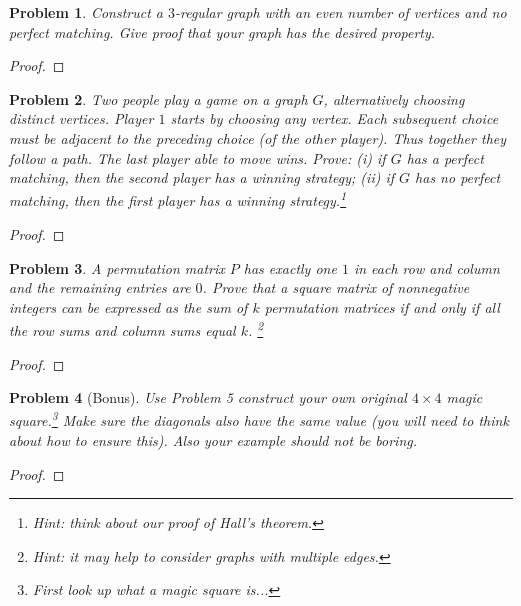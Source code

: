 \documentclass[11pt]{article}
\newtheorem{problem}{Problem}
\begin{document}
\begin{problem}
Construct a $3$-regular graph with an even number of vertices and no perfect matching. Give proof that your graph has the desired property. 
\end{problem}

\begin{proof}

\end{proof}

\begin{problem}
Two people play a game on a graph $G$, alternatively choosing distinct vertices. Player $1$ starts by choosing any vertex. Each subsequent choice must be adjacent to the preceding choice (of the other player). Thus together they follow a path. The last player able to move wins. Prove: (i) if $G$ has a perfect matching, then the second player has a winning strategy; (ii) if $G$ has no perfect matching, then the first player has a winning strategy.\footnote{Hint: think about our proof of Hall's theorem.} 
\end{problem}

\begin{proof}

\end{proof}

\begin{problem}
A permutation matrix $P$ has exactly one $1$ in each row and column and the remaining entries are $0$.  Prove that a square matrix of nonnegative integers can be expressed as the sum of $k$ permutation matrices if and only if all the row sums and column sums equal $k$. \footnote{Hint: it may help to consider graphs with multiple edges. }
\end{problem}

\begin{proof}

\end{proof}

\begin{problem}[Bonus] Use Problem 5 construct your own original $4\times 4$ magic square.\footnote{First look up what a magic square is...} Make sure the diagonals also have the same value (you will need to think about how to ensure this). Also your example should not be boring.
\end{problem}

\begin{proof}

\end{proof}
\end{document}
